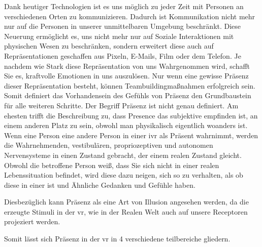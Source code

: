 \documentclass[a4paper,11pt]{article}%
\renewcommand{\\}{\vspace*{0.5\baselineskip} \newline}
\begin{document}
			Dank heutiger Technologien ist es uns möglich zu jeder Zeit mit Personen an verschiedenen Orten zu kommunizieren. Dadurch ist Kommunikation nicht mehr nur auf die Personen in unserer unmittelbaren Umgebung beschränkt. 
			Diese Neuerung ermöglicht es, uns nicht mehr nur auf \grqq Soziale Interaktionen \glqq mit physischen Wesen zu beschränken, sondern erweitert diese auch auf Repräsentationen geschaffen aus Pixeln, E-Mails, Film oder dem Telefon. Je nachdem wie Stark diese Repräsentation von uns Wahrgenommen wird, schafft Sie es, kraftvolle Emotionen in uns auszulösen.\citep[p. 4-6]{biocca2002defining}\\
			Nur wenn eine gewisse Präsenz dieser Repräsentation besteht, können Teambuildingmaßnahmen erfolgreich sein. Somit definiert das Vorhandensein des Gefühls von Präsenz den Grundbaustein für alle weiteren Schritte.\\
			Der Begriff \grqq Präsenz \glqq ist nicht genau definiert. Am ehesten trifft die Beschreibung zu, dass Presence das subjektive empfinden ist, an einem anderen Platz zu sein, obwohl man physikalisch eigentlich woanders ist. \citep[p. 1]{witmer1998measuring}\\
			Wenn eine Person eine andere Person in einer \ac{ivr} als Präsent wahrnimmt, werden die Wahrnehmenden, vestibulären, propriozeptiven und autonomen Nervensysteme in einen Zustand gebracht, der einem realen Zustand gleicht. Obwohl die betroffene Person weiß, dass Sie sich nicht in einer realen Lebenssituation befindet, wird diese dazu neigen, sich so zu verhalten, als ob diese in einer ist und Ähnliche Gedanken und Gefühle haben. \citep{slater2003note}

Diesbezüglich kann Präsenz als eine Art von Illusion angesehen werden, da die erzeugte Stimuli in der \ac{vr}, wie in der Realen Welt auch auf unsere Receptoren projeziert werden.

Somit lässt sich Präsenz in der \ac{vr} in 4 verschiedene teilbereiche gliedern.
\end{document}
